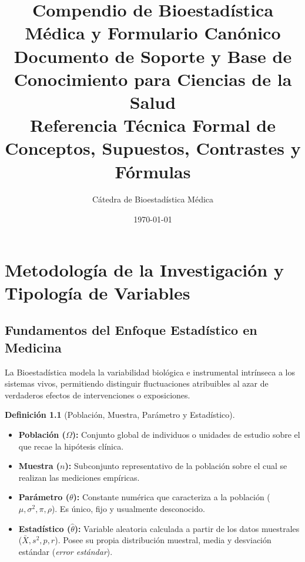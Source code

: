\documentclass[11pt,a4paper]{report}
\title{\textbf{\LARGE Compendio de Bioestadística Médica y Formulario Canónico}\\
\large Documento de Soporte y Base de Conocimiento para Ciencias de la Salud\\
\small Referencia Técnica Formal de Conceptos, Supuestos, Contrastes y Fórmulas}
\author{Cátedra de Bioestadística Médica}
\date{\today}
\theoremstyle{definition}
\newtheorem{definition}{Definición}[chapter]
\begin{document}
\maketitle
\tableofcontents
\newpage

\chapter{Metodología de la Investigación y Tipología de Variables}

\section{Fundamentos del Enfoque Estadístico en Medicina}
La Bioestadística modela la variabilidad biológica e instrumental intrínseca a los sistemas vivos, permitiendo distinguir fluctuaciones atribuibles al azar de verdaderos efectos de intervenciones o exposiciones.

\begin{definition}[Población, Muestra, Parámetro y Estadístico]
\begin{itemize}[leftmargin=*]
    \item \textbf{Población ($\Omega$):} Conjunto global de individuos o unidades de estudio sobre el que recae la hipótesis clínica.
    \item \textbf{Muestra ($n$):} Subconjunto representativo de la población sobre el cual se realizan las mediciones empíricas.
    \item \textbf{Parámetro ($\theta$):} Constante numérica que caracteriza a la población ($\mu, \sigma^2, \pi, \rho$). Es único, fijo y usualmente desconocido.
    \item \textbf{Estadístico ($\hat{\theta}$):} Variable aleatoria calculada a partir de los datos muestrales ($\bar{X}, s^2, p, r$). Posee su propia distribución muestral, media y desviación estándar (\emph{error estándar}).
\end{itemize}
\end{definition}
\end{document}
